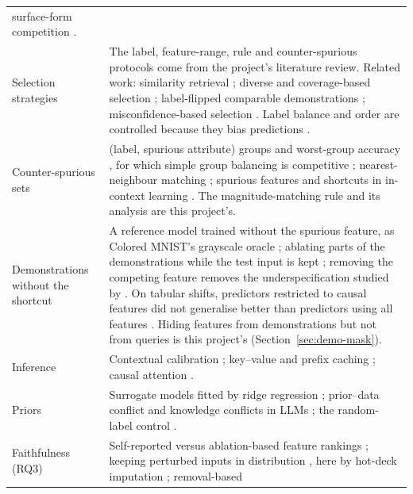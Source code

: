 \documentclass[11pt,a4paper]{article}
\newcommand{\1}{\mathbf{1}}
\theoremstyle{plain}
\theoremstyle{definition}
\theoremstyle{remark}
\begin{document}
{\begin{longtable}{L{3.0cm}L{13.0cm}}
surface-form competition \citep{holtzman2021surface}. \\
Selection strategies &
The label, feature-range, rule and counter-spurious protocols come from the
project's literature review. Related work: similarity retrieval
\citep{liu2022what}; diverse and coverage-based selection
\citep{levy2023diverse,gupta2023coverage}; label-flipped comparable
demonstrations \citep{fan2024comparable}; misconfidence-based selection
\citep{xu2024misconfidence}. Label balance and order are controlled because
they bias predictions
\citep{zhao2021calibrate,min2022rethinking,lu2022fantastically}. \\
Counter-spurious sets &
(label, spurious attribute) groups and worst-group accuracy
\citep{sagawa2020distributionally}, for which simple group balancing is
competitive \citep{idrissi2022simple}; nearest-neighbour
matching \citep{rubin1973matching,stuart2010matching}; spurious features
and shortcuts in in-context learning
\citep{si2023measuring,tang2023large,harutyunyan2026incontext,chen2026incontext}.
The
magnitude-matching rule and its analysis are this project's. \\
Demonstrations without the shortcut &
A reference model trained without the spurious feature, as Colored MNIST's
grayscale oracle \citep{arjovsky2019invariant}; ablating parts of the
demonstrations while the test input is kept \citep{min2022rethinking};
removing the competing feature removes the underspecification studied by
\citet{si2023measuring}. On tabular shifts, predictors restricted to causal
features did not generalise better than predictors using all features
\citep{nastl2024causal}. Hiding features from demonstrations but not from
queries is this project's (Section~\ref{sec:demo-mask}). \\
Inference &
Contextual calibration \citep{zhao2021calibrate}; key--value and prefix
caching \citep{pope2023efficiently,gim2024prompt,zheng2024sglang}; causal
attention \citep{vaswani2017attention}. \\
Priors &
Surrogate models \citep{craven1996extracting,ribeiro2016why} fitted by
ridge regression \citep{hoerl1970ridge}; prior--data conflict
\citep{evans2006checking} and knowledge conflicts in LLMs
\citep{longpre2021entity,xie2024adaptive}; the random-label control
\citep{min2022rethinking}. \\
Faithfulness (RQ3) &
Self-reported versus ablation-based feature rankings \citep{li2025stads};
keeping perturbed inputs in distribution \citep{zhu2026faithfulness},
here by hot-deck imputation \citep{andridge2010review}; removal-based

\end{longtable}}
\end{document}
